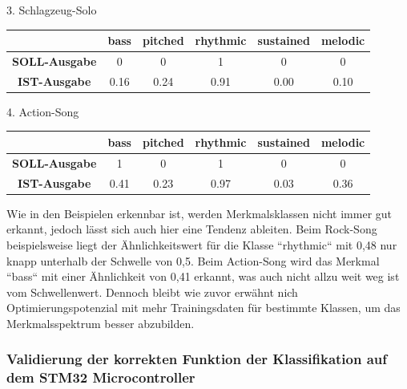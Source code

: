 \begin{adjustwidth}{0.5cm}{0cm}
3. Schlagzeug-Solo

\begin{table}[h!]
\centering
\begin{tabular}{|c|c|c|c|c|c|}
    \hline
     & \textbf{bass} & \textbf{pitched} & \textbf{rhythmic} & \textbf{sustained} & \textbf{melodic} \\ \hline
    \textbf{SOLL-Ausgabe} & 0 & 0 & 1 & 0 & 0 \\ \hline
    \textbf{IST-Ausgabe} & 0.16 & 0.24 & 0.91 & 0.00 & 0.10 \\ \hline
\end{tabular}
\end{table}

4. Action-Song

\begin{table}[h!]
\centering
\begin{tabular}{|c|c|c|c|c|c|}
    \hline
     & \textbf{bass} & \textbf{pitched} & \textbf{rhythmic} & \textbf{sustained} & \textbf{melodic} \\ \hline
    \textbf{SOLL-Ausgabe} & 1 & 0 & 1 & 0 & 0 \\ \hline
    \textbf{IST-Ausgabe} & 0.41 & 0.23 & 0.97 & 0.03 & 0.36 \\ \hline
\end{tabular}
\end{table}

Wie in den Beispielen erkennbar ist, werden Merkmalsklassen nicht immer gut erkannt, jedoch lässt sich auch hier eine Tendenz ableiten. Beim Rock-Song beispielsweise liegt der Ähnlichkeitswert für die Klasse ``rhythmic`` mit 0,48 nur knapp unterhalb der Schwelle von 0,5. Beim Action-Song wird das Merkmal ``bass`` mit einer Ähnlichkeit von 0,41 erkannt, was auch nicht allzu weit weg ist vom Schwellenwert. Dennoch bleibt wie zuvor erwähnt nich Optimierungspotenzial mit mehr Trainingsdaten für bestimmte Klassen, um das Merkmalsspektrum besser abzubilden.

\end{adjustwidth}

%
%
%
%

\subsubsection{Validierung der korrekten Funktion der Klassifikation auf dem STM32 Microcontroller}

